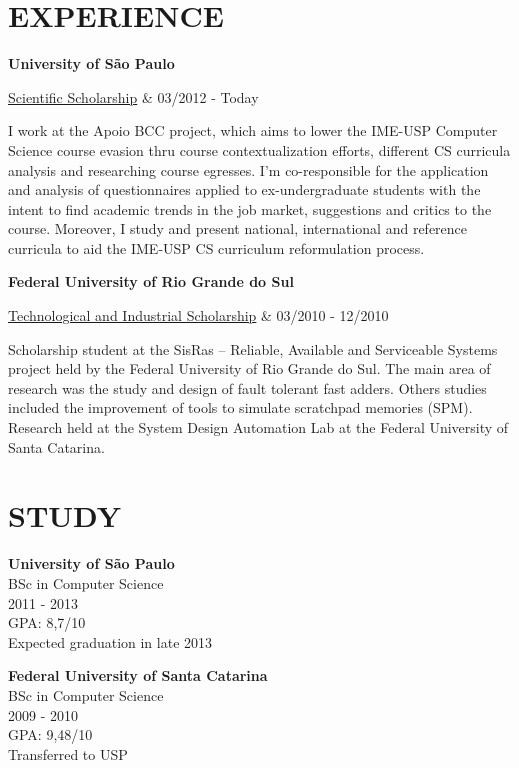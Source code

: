 \documentclass[margin=<value>,11pt]{res} %
\begin{document}
\begin{resume}
\section{EXPERIENCE}
	{\bf University of São Paulo} \\
		\begin{ncolumn}{2} %
		\underline{Scientific Scholarship}     &      03/2012 - Today
		\end{ncolumn}
		I work at the Apoio BCC project, which aims to lower the IME-USP Computer Science course evasion thru course contextualization efforts, different CS curricula analysis and researching course egresses. I'm co-responsible for the application and analysis of questionnaires applied to ex-undergraduate students with the intent to find academic trends in the job market, suggestions and critics to the course. Moreover, I study and present national, international and reference curricula to aid the IME-USP CS curriculum reformulation process.


	{\bf Federal University of Rio Grande do Sul} \\
		\begin{ncolumn}{2} %
		\underline{Technological and Industrial Scholarship}     &      03/2010 - 12/2010
		\end{ncolumn}
		Scholarship student at the SisRas -- Reliable, Available and Serviceable Systems project held by the Federal University of Rio Grande do Sul. The main area of research was the study and design of fault tolerant fast adders. Others studies included the improvement of tools to simulate scratchpad memories (SPM). Research held at the System Design Automation Lab at the Federal University of Santa Catarina.
 
\section{STUDY} 
	{\bf University of São Paulo}\\
	BSc in Computer Science \\
	2011 - 2013 \\
	GPA: 8,7/10 \\
	Expected graduation in late 2013

	{\bf Federal University of Santa Catarina}\\
	BSc in Computer Science \\
	2009 - 2010 \\
	GPA: 9,48/10 \\
	Transferred to USP \\


\end{resume}
\end{document}
